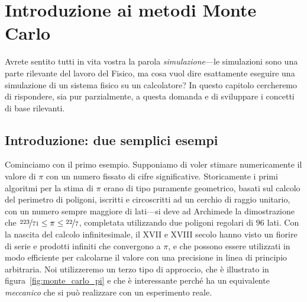 \chapter{Introduzione ai metodi Monte Carlo}
\label{sec:monte_carlo}

Avrete sentito tutti in vita vostra la parola \emph{simulazione}---le
simulazioni sono una parte rilevante del lavoro del Fisico, ma cosa
vuol dire esattamente eseguire una simulazione di un sistema fisico su un
calcolatore? In questo capitolo cercheremo di rispondere, sia pur parzialmente,
a questa domanda e di sviluppare i concetti di base rilevanti.


\section{Introduzione: due semplici esempi}

Cominciamo con il primo esempio. Supponiamo di voler stimare numericamente il
valore di $\pi$ con un numero fissato di cifre significative. Storicamente i
primi algoritmi per la stima di $\pi$ erano di tipo puramente geometrico, basati
sul calcolo del perimetro di poligoni, iscritti e circoscritti ad un cerchio di
raggio unitario, con un numero sempre maggiore di lati---si deve ad Archimede
la dimostrazione che $\nicefrac{223}{71} \leq \pi \leq \nicefrac{22}{7}$,
completata utilizzando due poligoni regolari di $96$ lati. Con la nascita del
calcolo infinitesimale, il XVII e XVIII secolo hanno visto un fiorire di
serie e prodotti infiniti che convergono a $\pi$, e che possono essere
utilizzati in modo efficiente per calcolarne il valore con una precisione in
linea di principio arbitraria. Noi utilizzeremo un terzo tipo di approccio,
che è illustrato in figura~\ref{fig:monte_carlo_pi} e che è interessante
perché ha un equivalente \emph{meccanico} che si può realizzare con un
esperimento reale.


